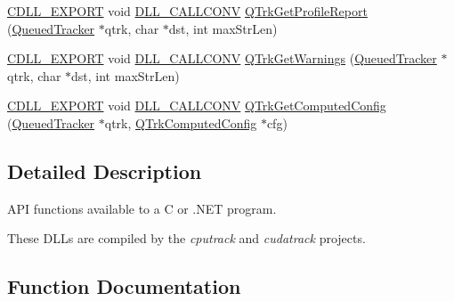 \begin{DoxyCompactItemize}
\item 
\hyperlink{dllmacros_8h_af97e4004759ff877db017c3d1a855482}{C\+D\+L\+L\+\_\+\+E\+X\+P\+O\+RT} void \hyperlink{dllmacros_8h_a6596c37c55424b395798708344d63791}{D\+L\+L\+\_\+\+C\+A\+L\+L\+C\+O\+NV} \hyperlink{group__c__api_ga2e1032468e06d1f27e9484c8aa93a008}{Q\+Trk\+Get\+Profile\+Report} (\hyperlink{class_queued_tracker}{Queued\+Tracker} $\ast$qtrk, char $\ast$dst, int max\+Str\+Len)
\item 
\hyperlink{dllmacros_8h_af97e4004759ff877db017c3d1a855482}{C\+D\+L\+L\+\_\+\+E\+X\+P\+O\+RT} void \hyperlink{dllmacros_8h_a6596c37c55424b395798708344d63791}{D\+L\+L\+\_\+\+C\+A\+L\+L\+C\+O\+NV} \hyperlink{group__c__api_gaba90d158e873117ee01076aef9ed99ae}{Q\+Trk\+Get\+Warnings} (\hyperlink{class_queued_tracker}{Queued\+Tracker} $\ast$qtrk, char $\ast$dst, int max\+Str\+Len)
\item 
\hyperlink{dllmacros_8h_af97e4004759ff877db017c3d1a855482}{C\+D\+L\+L\+\_\+\+E\+X\+P\+O\+RT} void \hyperlink{dllmacros_8h_a6596c37c55424b395798708344d63791}{D\+L\+L\+\_\+\+C\+A\+L\+L\+C\+O\+NV} \hyperlink{group__c__api_ga2e4eb3e4449138cd29ff40e1c1b06535}{Q\+Trk\+Get\+Computed\+Config} (\hyperlink{class_queued_tracker}{Queued\+Tracker} $\ast$qtrk, \hyperlink{struct_q_trk_computed_config}{Q\+Trk\+Computed\+Config} $\ast$cfg)
\end{DoxyCompactItemize}


\subsection{Detailed Description}
A\+PI functions available to a C or .N\+ET program. 

These D\+L\+Ls are compiled by the {\itshape cputrack} and {\itshape cudatrack} projects. 

\subsection{Function Documentation}
